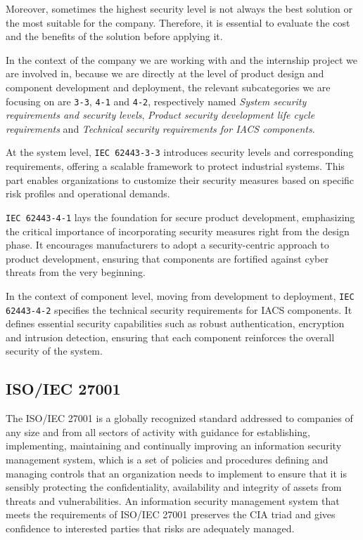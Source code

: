 Moreover, sometimes the highest security level is not always the best solution or the most suitable for the company. Therefore, it is essential to evaluate the cost and the benefits of the solution before applying it.

In the context of the company we are working with and the internship project we are involved in, because we are directly at the level of product design and component development and deployment, the relevant subcategories we are focusing on are \texttt{3-3}, \texttt{4-1} and \texttt{4-2}, respectively named \textit{System security requirements and security levels}, \textit{Product security development life cycle requirements} and \textit{Technical security requirements for IACS components}.

At the system level, \texttt{IEC 62443-3-3} introduces security levels and corresponding requirements, offering a scalable framework to protect industrial systems. This part enables organizations to customize their security measures based on specific risk profiles and operational demands.

\texttt{IEC 62443-4-1} lays the foundation for secure product development, emphasizing the critical importance of incorporating security measures right from the design phase. It encourages manufacturers to adopt a security-centric approach to product development, ensuring that components are fortified against cyber threats from the very beginning.

In the context of component level, moving from development to deployment, \texttt{IEC 62443-4-2} specifies the technical security requirements for IACS components. It defines essential security capabilities such as robust authentication, encryption and intrusion detection, ensuring that each component reinforces the overall security of the system.~\cite{iec-62443-safeguarding-industrial-automation-linkedin}


\subsection{ISO/IEC 27001}

The ISO/IEC 27001 is a globally recognized standard addressed to companies of any size and from all sectors of activity with guidance for establishing, implementing, maintaining and continually improving an information security management system, which is a set of policies and procedures defining and managing controls that an organization needs to implement to ensure that it is sensibly protecting the confidentiality, availability and integrity of assets from threats and vulnerabilities. An information security management system that meets the requirements of ISO/IEC 27001 preserves the CIA triad and gives confidence to interested parties that risks are adequately managed.

